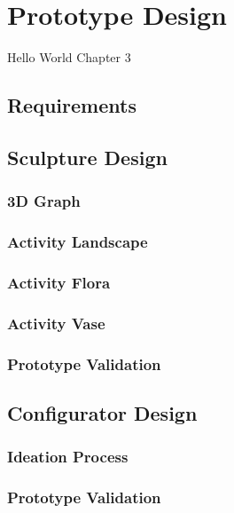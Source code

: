 \documentclass[../medieninformatik-arbeit.tex]{subfiles}
\begin{document}
\label{ch:proto}
\section{Prototype Design}
Hello World Chapter 3 

\subsection{Requirements}


\subsection{Sculpture Design}

\subsubsection{3D Graph}

\subsubsection{Activity Landscape}

\subsubsection{Activity Flora}

\subsubsection{Activity Vase}

\subsubsection{Prototype Validation}


\subsection{Configurator Design}

\subsubsection{Ideation Process}

\subsubsection{Prototype Validation}
\end{document}
